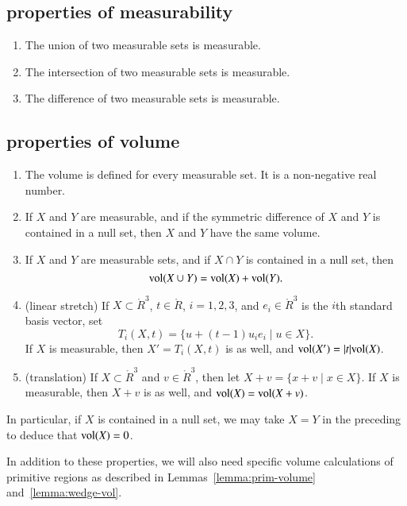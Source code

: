 \subsection{properties of measurability}

\begin{enumerate}%
 \item The union of two measurable sets is measurable.\\
 \item The intersection of two measurable sets is measurable.\\
 \item The difference of two measurable sets is measurable.
\end{enumerate}

\subsection{properties of volume}

\begin{enumerate}%
 \item The volume is defined for every measurable set.  It is
    a non-negative real number.
 \item If $X$ and $Y$ are  measurable, and if
 the symmetric difference of
 $X$ and $Y$ is contained in a null set, then 
    $X$ and $Y$ have the same volume.\\
 \item If $X$ and $Y$ are measurable sets, and if $X\cap
 Y$ is contained in a null set, then
    $$
    {\operatorname{vol}}(X\cup Y) = {\operatorname{vol}}(X) + {\operatorname{vol}}(Y).
    $$
  \item (linear stretch) If $X\subset \ring{R}^3$, $t\in\ring{R}$, 
    $i=1,2,3$, and $e_i\in\ring{R}^3$ is the $i$th standard basis vector,
    set 
      $$T_i(X,t) = \{ u + (t-1) u_i e_i \mid u\in X\}.
      $$
    If $X$ is measurable, then $X'=T_i(X,t)$ is as well,
    and ${\operatorname{vol}}(X') = |t|{\operatorname{vol}}(X)$.
  \item (translation) If $X\subset \ring{R}^3$ and $v\in\ring{R}^3$, then let
    $X+v = \{x + v\mid x\in X\}$.  If $X$ is measurable, then $X+v$ is
    as well, and ${\operatorname{vol}}(X) = {\operatorname{vol}}(X+v)$.
\end{enumerate}

In particular, if $X$ is contained in a null set, we may take
$X=Y$ in the preceding to deduce that ${\operatorname{vol}}(X)=0$.

In addition to these properties, we will also need specific
volume calculations of primitive regions as described in
Lemmas~\ref{lemma:prim-volume} and~\ref{lemma:wedge-vol}.

